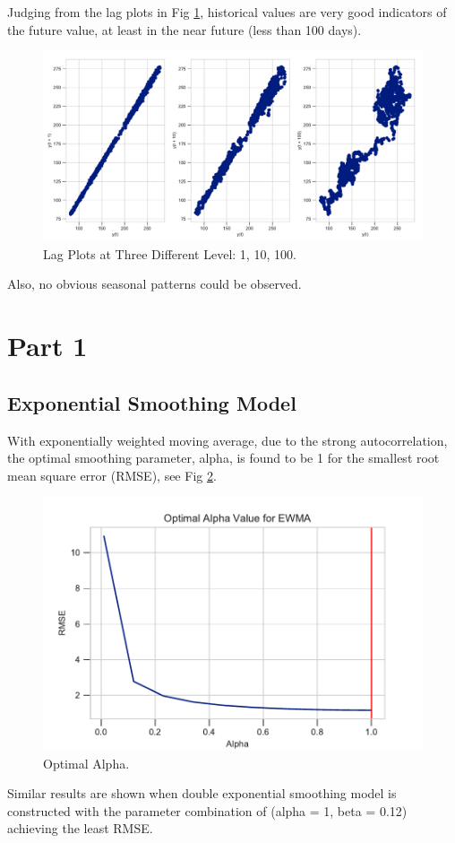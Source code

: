 \documentclass[]{article}
\begin{document}
%
Judging from the lag plots in Fig \ref{fig:three_lag_plots}, historical values are very good indicators of the future value, at least in the near future (less than 100 days). 
%
\begin{figure}[hbtp]
	\centering
	\includegraphics[width=1\columnwidth]{../Figures/three_lag_plots.pdf}
	\caption{Lag Plots at Three Different Level: 1, 10, 100.}
	\label{fig:three_lag_plots}
\end{figure}
%
Also, no obvious seasonal patterns could be observed. 


\section{Part 1}
\subsection{Exponential Smoothing Model}
With exponentially weighted moving average, due to the strong autocorrelation, the optimal smoothing parameter, alpha, is found to be 1 for the smallest root mean square error (RMSE), see Fig \ref{fig:optimal_alpha_ewma}.
%
\begin{figure}[hbtp]
	\centering
	\includegraphics[width=1\columnwidth]{../Figures/optimal_alpha_ewma.pdf}
	\caption{Optimal Alpha.}
	\label{fig:optimal_alpha_ewma}
\end{figure}
%
Similar results are shown when double exponential smoothing model is constructed with the parameter combination of (alpha = 1, beta = 0.12) achieving the least RMSE. 
\end{document}
